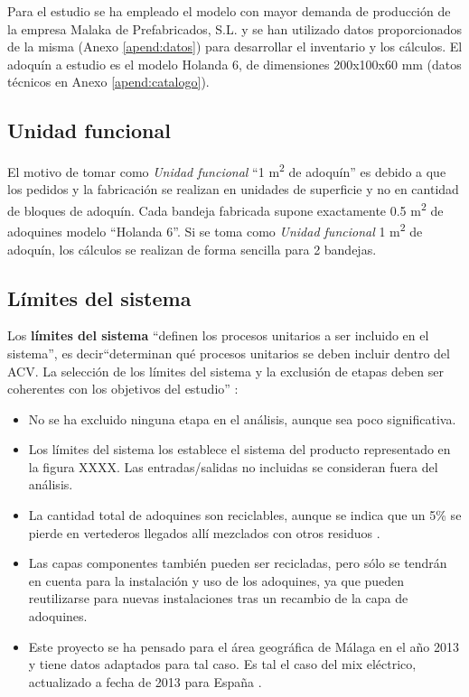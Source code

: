 Para el estudio se ha empleado el modelo con mayor demanda de producción de la empresa Malaka de Prefabricados, S.L. y se han utilizado datos proporcionados de la misma (Anexo \ref{apend:datos}) para desarrollar el inventario y los cálculos. El adoquín a estudio es el modelo Holanda 6, de dimensiones 200x100x60 \si{mm} (datos técnicos en Anexo \ref{apend:catalogo}).


\subsection{Unidad funcional}\label{sec:unidad_funcional}
El motivo de tomar como \textit{Unidad funcional} ``1 \si{m^2} de adoquín'' es debido a que los pedidos y la fabricación se realizan en unidades de superficie y no en cantidad de bloques de adoquín. Cada bandeja fabricada supone exactamente 0.5 \si{m^2} de adoquines modelo ``Holanda 6''. Si se toma como \textit{Unidad funcional} 1 \si{m^2} de adoquín, los cálculos se realizan de forma sencilla para 2 bandejas.

\subsection{Límites del sistema}
Los \textbf{límites del sistema} ``definen los procesos unitarios a ser incluido en el sistema'', es decir``determinan qué procesos unitarios se deben incluir dentro del ACV. La selección de los límites del sistema y la exclusión de etapas deben ser coherentes con los objetivos del estudio'' \cite{iso14040}:

\begin{itemize}
  \item No se ha excluido ninguna etapa en el análisis, aunque sea poco significativa.
  \item Los límites del sistema los establece el sistema del producto representado en la figura XXXX. Las entradas/salidas no incluidas se consideran fuera del análisis.
  \item La cantidad total de adoquines son reciclables, aunque se indica que un 5\% se pierde en vertederos llegados allí mezclados con otros residuos \cite{euroadoquin}.
  \item Las capas componentes también pueden ser recicladas, pero sólo se tendrán en cuenta para la instalación y uso de los adoquines, ya que pueden reutilizarse para nuevas instalaciones tras un recambio de la capa de adoquines.
  \item Este proyecto se ha pensado para el área geográfica de Málaga en el año 2013 y tiene datos adaptados para tal caso. Es tal el caso del mix eléctrico, actualizado a fecha de 2013 para España \cite{mlgceballos}.
\end{itemize}

